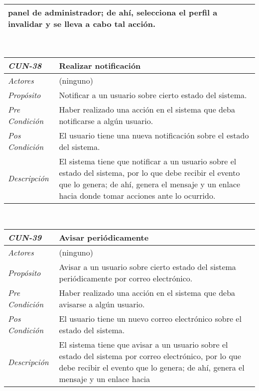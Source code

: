 \begin{center}
{\begin{tabular}{ | p{3cm} | p{12.5cm} | }
	panel de administrador; de ah\'i, selecciona el
	perfil a invalidar y se lleva a cabo tal acci\'on. \\
	\hline
\end{tabular}} \\[1cm]
\hypertarget{CUN-38}{%
\begin{tabular}{ | p{3cm} | p{12.5cm} | }
	\hline
	\rowcolor{lightgray}
	\hfil \textbf{\textit{CUN-38}} &
	\hfil \textbf{Realizar notificaci\'on} \\
	\hline
	\raggedleft \textit{Actores} & (ninguno) \\
	\hline
	\raggedleft \textit{Prop\'osito} & Notificar a un
	usuario sobre cierto estado del sistema. \\
	\hline
	\raggedleft \textit{Pre Condici\'on} & Haber
	realizado una acci\'on en el sistema que deba
	notificarse a alg\'un usuario. \\
	\hline
	\raggedleft \textit{Pos Condici\'on} & El usuario
	tiene una nueva notificaci\'on sobre el estado
	del sistema. \\
	\hline
	\raggedleft \textit{Descripci\'on} &
	El sistema tiene que notificar a un usuario sobre
	el estado del sistema, por lo que debe recibir
	el evento que lo genera; de ah\'i, genera el
	mensaje y un enlace hacia donde tomar acciones
	ante lo ocurrido. \\
	\hline
\end{tabular}} \\[1cm]
\hypertarget{CUN-39}{%
\begin{tabular}{ | p{3cm} | p{12.5cm} | }
	\hline
	\rowcolor{lightgray}
	\hfil \textbf{\textit{CUN-39}} &
	\hfil \textbf{Avisar peri\'odicamente} \\
	\hline
	\raggedleft \textit{Actores} & (ninguno) \\
	\hline
	\raggedleft \textit{Prop\'osito} & Avisar a un
	usuario sobre cierto estado del sistema
	peri\'odicamente por correo electr\'onico. \\
	\hline
	\raggedleft \textit{Pre Condici\'on} & Haber
	realizado una acci\'on en el sistema que deba
	avisarse a alg\'un usuario. \\
	\hline
	\raggedleft \textit{Pos Condici\'on} & El usuario
	tiene un nuevo correo electr\'onico sobre el estado
	del sistema. \\
	\hline
	\raggedleft \textit{Descripci\'on} &
	El sistema tiene que avisar a un usuario sobre
	el estado del sistema por correo electr\'onico,
	por lo que debe recibir el evento que lo genera;
	de ah\'i, genera el mensaje y un enlace hacia

\end{tabular}}
\end{center}
